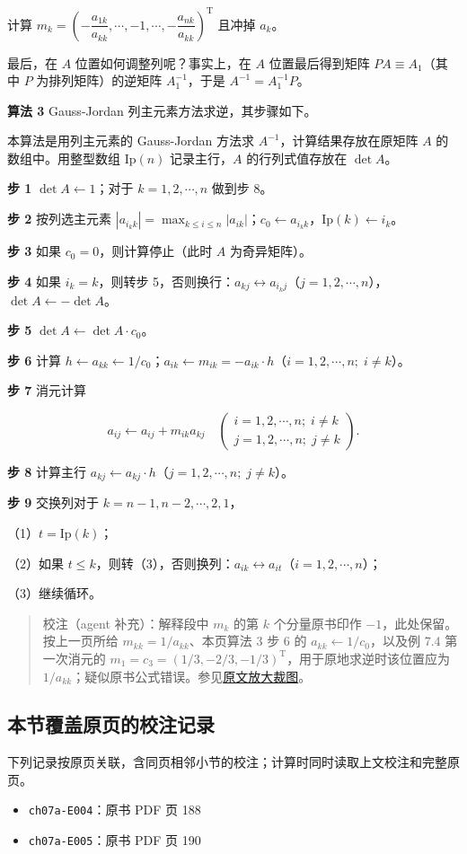 \documentclass[
  10pt,
  fontset=fandol]{ctexart}
\providecommand{\tightlist}{%
  \setlength{\itemsep}{0pt}\setlength{\parskip}{0pt}}
\begin{document}
计算 \(m_k=\left(-\dfrac{a_{1k}}{a_{kk}},\allowbreak \cdots,\allowbreak -1,\allowbreak \cdots,\allowbreak -\dfrac{a_{nk}}{a_{kk}}\right)^{\mathrm T}\) 且冲掉 \(a_k\)。

最后，在 \(A\) 位置如何调整列呢？事实上，在 \(A\) 位置最后得到矩阵 \(PA\equiv A_1\)（其中 \(P\) 为排列矩阵）的逆矩阵 \(A_1^{-1}\)，于是 \(A^{-1}=A_1^{-1}P\)。

\textbf{算法 3} Gauss-Jordan 列主元素方法求逆，其步骤如下。

本算法是用列主元素的 Gauss-Jordan 方法求 \(A^{-1}\)，计算结果存放在原矩阵 \(A\) 的数组中。用整型数组 \(\mathrm{Ip}(n)\) 记录主行，\(A\) 的行列式值存放在 \(\det A\)。

\textbf{步 1} \(\det A\leftarrow1\)；对于 \(k=1,2,\cdots,n\) 做到步 8。

\textbf{步 2} 按列选主元素 \(|a_{i_kk}|=\max_{k\le i\le n}|a_{ik}|\)；\(c_0\leftarrow a_{i_kk}\)，\(\mathrm{Ip}(k)\leftarrow i_k\)。

\textbf{步 3} 如果 \(c_0=0\)，则计算停止（此时 \(A\) 为奇异矩阵）。

\textbf{步 4} 如果 \(i_k=k\)，则转步 5，否则换行：\(a_{kj}\leftrightarrow a_{i_kj}\)（\(j=1,2,\cdots,n\)），\(\det A\leftarrow-\det A\)。

\textbf{步 5} \(\det A\leftarrow\det A\cdot c_0\)。

\textbf{步 6} 计算 \(h\leftarrow a_{kk}\leftarrow1/c_0\)；\(a_{ik}\leftarrow m_{ik}=-a_{ik}\cdot h\)（\(i=1,2,\cdots,n;\;i\ne k\)）。

\textbf{步 7} 消元计算

\[a_{ij}\leftarrow a_{ij}+m_{ik}a_{kj}\quad
\left(\begin{array}{l}i=1,2,\cdots,n;\;i\ne k\\j=1,2,\cdots,n;\;j\ne k\end{array}\right).\]

\textbf{步 8} 计算主行 \(a_{kj}\leftarrow a_{kj}\cdot h\)（\(j=1,2,\cdots,n;\;j\ne k\)）。

\textbf{步 9} 交换列对于 \(k=n-1,n-2,\cdots,2,1\)，

（1）\(t=\mathrm{Ip}(k)\)；

（2）如果 \(t\le k\)，则转（3），否则换列：\(a_{ik}\leftrightarrow a_{it}\)（\(i=1,2,\cdots,n\)）；

（3）继续循环。

\begin{quote}
校注（agent 补充）：解释段中 \(m_k\) 的第 \(k\) 个分量原书印作 \(-1\)，此处保留。按上一页所给 \(m_{kk}=1/a_{kk}\)、本页算法 3 步 6 的 \(a_{kk}\leftarrow1/c_0\)，以及例 7.4 第一次消元的 \(m_1=c_3=(1/3,-2/3,-1/3)^{\mathrm T}\)，用于原地求逆时该位置应为 \(1/a_{kk}\)；疑似原书公式错误。参见\href{../assets/ch07a/pdf-190-multiplier-detail.png}{原文放大裁图}。
\end{quote}

\subsection{本节覆盖原页的校注记录}\label{ux672cux8282ux8986ux76d6ux539fux9875ux7684ux6821ux6ce8ux8bb0ux5f55}

下列记录按原页关联，含同页相邻小节的校注；计算时同时读取上文校注和完整原页。

\begin{itemize}
\tightlist
\item
  \texttt{ch07a-E004}：原书 PDF 页 188
\item
  \texttt{ch07a-E005}：原书 PDF 页 190
\end{itemize}
\end{document}
